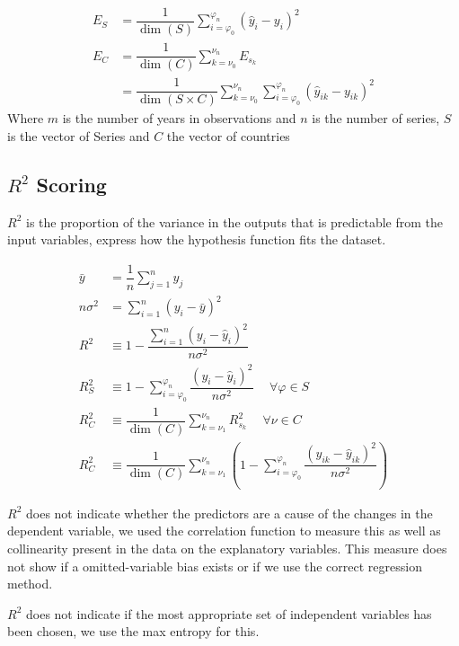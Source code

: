 \documentclass[a4project, twocolumn]{article}
\newcommand{\Para}[1]{\left( #1 \right)}
\begin{document}
\begin{align*}
    E_S &= \dfrac{1}{\dim{(S)}}\sum^{\varphi_n}_{i=\varphi_0} \Para{\hat{y}_i-y_i}^2\\
    E_C &= \dfrac{1}{\dim{(C)}} \sum^{\nu_n}_{k=\nu_0} E_{s_k}\\
    &= \dfrac{1}{\dim{(S \times C)}} \sum^{\nu_n}_{k=\nu_0} \sum^{\varphi_n}_{i=\varphi_0}  \Para{\hat{y}_{ik}-y_{ik}}^2 
\end{align*}
Where $m$ is the number of years in observations and $n$ is the number of series, $S$ is the vector of Series and $C$ the vector of countries

\subsection{$R^2$ Scoring}

$R^2$ is the proportion of the variance in the outputs that is predictable from the input variables, express how the hypothesis function fits the dataset.

\begin{align*}
    \bar{y} &= \dfrac{1}{n} \sum^{n}_{j=1} y_j\\
    n\sigma^2 &= \sum^{n}_{i=1}\Para{y_i - \bar{y}}^2\\
    R^2 &\equiv 1 - \dfrac{\sum^{n}_{i=1}\Para{y_i-\hat{y}_i}^2}{n\sigma^2}\\
    R^2_S &\equiv 1 - \sum^{\varphi_n}_{i=\varphi_0}  \dfrac{\Para{y_i-\hat{y}_i}^2}{n\sigma^2}\hspace{15pt} \forall \varphi \in S\\
    R^2_C &\equiv \dfrac{1}{\dim{(C)}} \sum^{\nu_n}_{k=\nu_1} R^2_{s_k}\hspace{15pt}\forall \nu \in C\\
    R^2_C &\equiv \dfrac{1}{\dim{(C)}} \sum^{\nu_n}_{k=\nu_1} \Para{1 - \sum^{\varphi_n}_{i=\varphi_0} \dfrac{\Para{y_{ik}-\hat{y}_{ik}}^2}{n \sigma^2} }
\end{align*}

$R^2$ does not indicate whether the predictors are a cause of the changes in the dependent variable, we used the correlation function to measure this as well as  collinearity present in the data on the explanatory variables. This measure does not show if a omitted-variable bias exists or if we use the correct regression method.

$R^2$ does not indicate if the most appropriate set of independent variables has been chosen, we use the max entropy for this. 
\end{document}
